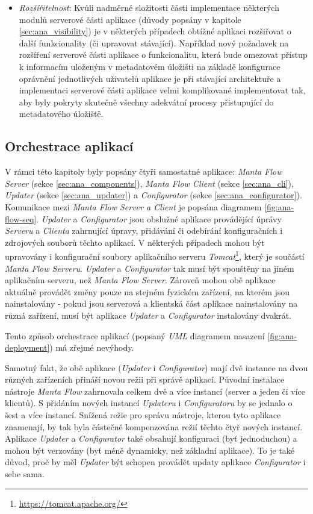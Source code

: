 \begin{itemize}
	\item{\textit{Rozšířitelnost}}: Kvůli nadměrné složitosti části implementace některých modulů serverové části aplikace (důvody popsány v kapitole \ref{sec:ana_visibility}) je v některých případech obtížné aplikaci rozšiřovat o další funkcionality (či upravovat stávající). Například nový požadavek na rozšíření serverové části aplikace o funkcionalitu, která bude omezovat přístup k informacím uloženým v metadatovém úložišti na základě konfigurace oprávnění jednotlivých uživatelů aplikace je při stávající architektuře a implementaci serverové části aplikace velmi komplikované implementovat tak, aby byly pokryty skutečně všechny adekvátní procesy přistupující do metadatového úložiště.
\end{itemize}


\subsection{Orchestrace aplikací}
\label{sec:ana_orchestrace}
V rámci této kapitoly byly popsány čtyři samostatné aplikace: \textit{Manta Flow Server} (sekce \ref{sec:ana_components}), \textit{Manta Flow Client} (sekce \ref{sec:ana_cli}), \textit{Updater} (sekce \ref{sec:ana_updater}) a
\textit{Configurator} (sekce \ref{sec:ana_configurator}).
Komunikace mezi \textit{Manta Flow Server a Client} je popsána diagramem \ref{fig:ana-flow-seq}. \textit{Updater} a \textit{Configurator} jsou obslužné aplikace provádějící úprávy \textit{Serveru} a \textit{Clienta} zahrnující úpravy, přidávání či odebírání konfiguračních i zdrojových souborů těchto aplikací. V některých případech mohou být upravovány i konfigurační soubory aplikačního serveru \textit{Tomcat}\footnote{\url{https://tomcat.apache.org/}}, který je součástí \textit{Manta Flow Serveru}. \textit{Updater} a \textit{Configurator} tak musí být spouštěny na jiném aplikačním serveru, než \textit{Manta Flow Server}.
Zároveň mohou obě aplikace aktuálně provádět změny pouze na stejném fyzickém zařízení, na kterém jsou nainstalovány - pokud jsou serverová a klientská část aplikace nainstalovány na různá zařízení, musí být aplikace \textit{Updater} a \textit{Configurator} instalovány dvakrát.

Tento způsob orchestrace aplikací (popsaný \textit{UML} diagramem nasazení \ref{fig:ana-deployment}) má zřejmé nevýhody.

Samotný fakt, že obě aplikace (\textit{Updater} i \textit{Configurator}) mají dvě instance na dvou různých zařízeních přináší novou režii při správě aplikací. Původní instalace nástroje \textit{Manta Flow} zahrnovala celkem dvě a více instancí (server a jeden či více klientů). S přidáním nových instancí \textit{Updateru} i \textit{Configuratoru} by se jednalo o šest a více instancí. Snížená režie pro správu nástroje, kterou tyto aplikace znamenají, by tak byla částečně kompenzována režií těchto čtyř nových instancí. Aplikace \textit{Updater} a \textit{Configurator} také obsahují konfiguraci (byť jednoduchou) a mohou být verzovány (byť méně dynamicky, než základní aplikace). To je také důvod, proč by měl \textit{Updater} být schopen provádět updaty aplikace \textit{Configurator} i sebe sama.

